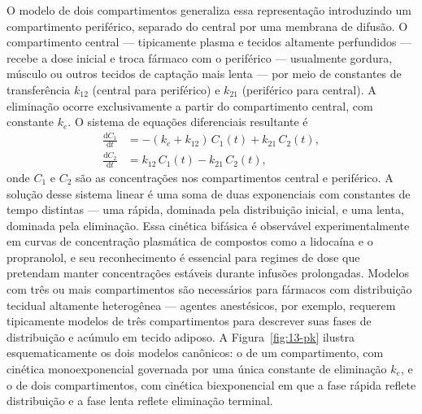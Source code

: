 O modelo de dois compartimentos generaliza essa representação introduzindo um compartimento periférico, separado do central por uma membrana de difusão. O compartimento central --- tipicamente plasma e tecidos altamente perfundidos --- recebe a dose inicial e troca fármaco com o periférico --- usualmente gordura, músculo ou outros tecidos de captação mais lenta --- por meio de constantes de transferência $k_{12}$ (central para periférico) e $k_{21}$ (periférico para central). A eliminação ocorre exclusivamente a partir do compartimento central, com constante $k_e$. O sistema de equações diferenciais resultante é
\begin{align*}
\frac{\mathrm{d}C_1}{\mathrm{d}t} &= -(k_e + k_{12}) \, C_1(t) + k_{21} \, C_2(t), \\
\frac{\mathrm{d}C_2}{\mathrm{d}t} &= k_{12} \, C_1(t) - k_{21} \, C_2(t),
\end{align*}
onde $C_1$ e $C_2$ são as concentrações nos compartimentos central e periférico. A solução desse sistema linear é uma soma de duas exponenciais com constantes de tempo distintas --- uma rápida, dominada pela distribuição inicial, e uma lenta, dominada pela eliminação. Essa cinética bifásica é observável experimentalmente em curvas de concentração plasmática de compostos como a lidocaína e o propranolol, e seu reconhecimento é essencial para regimes de dose que pretendam manter concentrações estáveis durante infusões prolongadas. Modelos com três ou mais compartimentos são necessários para fármacos com distribuição tecidual altamente heterogênea --- agentes anestésicos, por exemplo, requerem tipicamente modelos de três compartimentos para descrever suas fases de distribuição e acúmulo em tecido adiposo. A Figura~\ref{fig:13-pk} ilustra esquematicamente os dois modelos canônicos: o de um compartimento, com cinética monoexponencial governada por uma única constante de eliminação $k_e$, e o de dois compartimentos, com cinética biexponencial em que a fase rápida reflete distribuição e a fase lenta reflete eliminação terminal.


